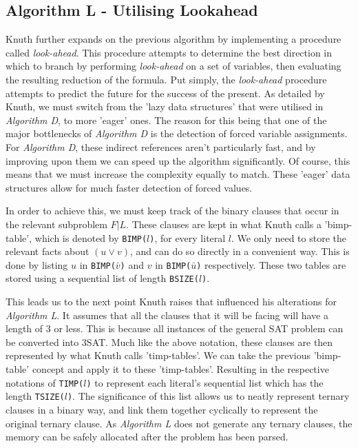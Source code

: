 \documentclass{article}
\begin{document}
\subsection{Algorithm L - Utilising Lookahead}
Knuth further expands on the previous algorithm by implementing a procedure called \textit{look-ahead}. This procedure attempts to
determine the best direction in which to branch by performing \textit{look-ahead} on a set of variables, then evaluating the
resulting reduction of the formula. Put simply, the \textit{look-ahead} procedure attempts to predict the future for the success
of the present. As detailed by Knuth, we must switch from the 'lazy data structures' that were utilised in \textit{Algorithm D},
to more 'eager' ones. The reason for this being that one of the major bottlenecks of \textit{Algorithm D} is the detection of
forced variable assignments. For \textit{Algorithm D}, these indirect references aren't particularly fast, and by improving upon
them we can speed up the algorithm significantly. Of course, this means that we must increase the complexity equally to match.
These 'eager' data structures allow for much faster detection of forced values. 

In order to achieve this, we must keep track of the binary clauses that occur in the relevant subproblem $F | L$. These clauses
are kept in what Knuth calls a 'bimp-table', which is denoted by \texttt{BIMP($l$)}, for every literal $l$. We only need to store
the relevant facts about $(u \vee v)$, and can do so directly in a convenient way. This is done by listing $u$ in
\texttt{BIMP($\bar{v}$)} and $v$ in \texttt{BIMP($\bar{u}$)} respectively. These two tables are stored using a sequential list of
length \texttt{BSIZE($l$)}.

This leads us to the next point Knuth raises that influenced his alterations for \textit{Algorithm L}. It assumes that all the
clauses that it will be facing will have a length of 3 or less. This is because all instances of the general SAT problem can be
converted into 3SAT. Much like the above notation, these clauses are then represented by what Knuth calls 'timp-tables'. We can
take the previous 'bimp-table' concept and apply it to these 'timp-tables'. Resulting in the respective notations of
\texttt{TIMP($l$)} to represent each literal's sequential list which has the length \texttt{TSIZE($l$)}. The significance of this
list allows us to neatly represent ternary clauses in a binary way, and link them together cyclically to represent the original
ternary clause. As \textit{Algorithm L} does not generate any ternary clauses, the memory can be safely allocated after the
problem has been parsed. 
\end{document}
